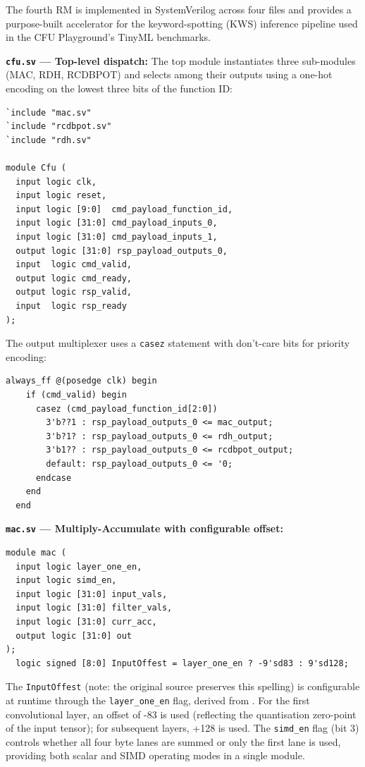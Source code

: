 The fourth RM is implemented in SystemVerilog across four files and provides a purpose-built accelerator for the keyword-spotting (KWS) inference pipeline used in the CFU Playground's TinyML benchmarks.

\textbf{\texttt{cfu.sv} — Top-level dispatch:} The top module instantiates three sub-modules (MAC, RDH, RCDBPOT) and selects among their outputs using a one-hot encoding on the lowest three bits of the function ID:

\begin{lstlisting}[style=mystyle]
`include "mac.sv"
`include "rcdbpot.sv"
`include "rdh.sv"

module Cfu (
  input logic clk,
  input logic reset,
  input logic [9:0]  cmd_payload_function_id,
  input logic [31:0] cmd_payload_inputs_0,
  input logic [31:0] cmd_payload_inputs_1,
  output logic [31:0] rsp_payload_outputs_0,
  input  logic cmd_valid,
  output logic cmd_ready,
  output logic rsp_valid,
  input  logic rsp_ready
);
\end{lstlisting}

The output multiplexer uses a \texttt{casez} statement with don't-care bits for priority encoding:

\begin{lstlisting}[style=mystyle]
  always_ff @(posedge clk) begin
    if (cmd_valid) begin
      casez (cmd_payload_function_id[2:0])
        3'b??1 : rsp_payload_outputs_0 <= mac_output;
        3'b?1? : rsp_payload_outputs_0 <= rdh_output;
        3'b1?? : rsp_payload_outputs_0 <= rcdbpot_output;
        default: rsp_payload_outputs_0 <= '0;
      endcase
    end
  end
\end{lstlisting}

\textbf{\texttt{mac.sv} — Multiply-Accumulate with configurable offset:}

\begin{lstlisting}[style=mystyle]
module mac (
  input logic layer_one_en,
  input logic simd_en,
  input logic [31:0] input_vals,
  input logic [31:0] filter_vals,
  input logic [31:0] curr_acc,
  output logic [31:0] out
);
  logic signed [8:0] InputOffest = layer_one_en ? -9'sd83 : 9'sd128;
\end{lstlisting}

The \texttt{InputOffest} (note: the original source preserves this spelling) is configurable at runtime through the \texttt{layer\_one\_en} flag, derived from . For the first convolutional layer, an offset of -83 is used (reflecting the quantisation zero-point of the input tensor); for subsequent layers, +128 is used. The \texttt{simd\_en} flag (bit 3) controls whether all four byte lanes are summed or only the first lane is used, providing both scalar and SIMD operating modes in a single module.

